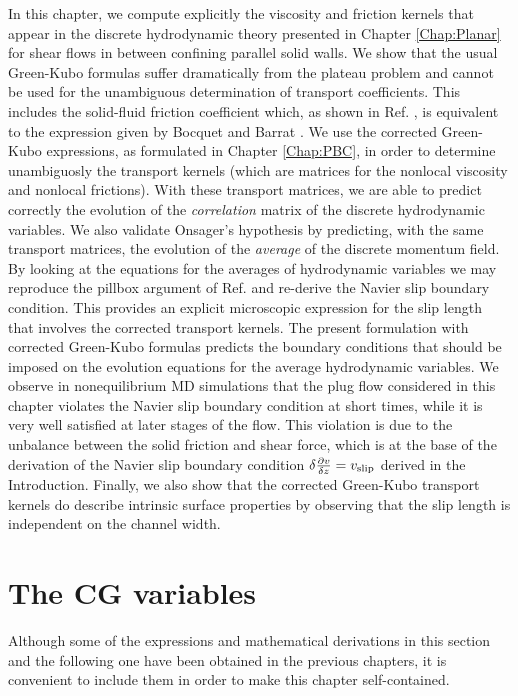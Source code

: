 \documentclass[b5paper,openright,10pt]{book}
\begin{document}
In this chapter, we compute explicitly the viscosity and friction kernels that appear in the discrete hydrodynamic theory presented in Chapter \ref{Chap:Planar} for shear flows in between confining parallel solid walls.  
We show  that  the  usual Green-Kubo  formulas  suffer
dramatically  from the  plateau problem  and  cannot be  used for  the
unambiguous  determination of  transport coefficients.   This includes
the solid-fluid friction coefficient which,  as shown in Ref. \cite{CamargoBC2018},
is  equivalent  to   the  expression  given  by   Bocquet  and  Barrat
\cite{Bocquet1994}.  We  use the corrected Green-Kubo  expressions, as
formulated in  Chapter \ref{Chap:PBC}, in  order to determine  unambiguosly the
transport kernels (which are matrices for the nonlocal viscosity and
nonlocal frictions).  With  these transport matrices, we  are able to
predict correctly the evolution  of the \textit{correlation} matrix of
the  discrete  hydrodynamic  variables.  We  also  validate  Onsager's
hypothesis  by  predicting,  with  the same  transport  matrices,  the
evolution of the \textit{average} of  the discrete momentum field.  By
looking at the equations for the averages of hydrodynamic variables we
may reproduce the pillbox argument of Ref.  \cite{CamargoBC2018} and re-derive the
Navier slip boundary condition.  This provides an explicit microscopic
expression for the  slip length that involves  the corrected transport
kernels.  The  present formulation with corrected  Green-Kubo formulas
predicts  the  boundary  conditions  that should  be  imposed  on  the
evolution equations for the average hydrodynamic variables. We observe
in nonequilibrium  MD simulations  that the  plug flow  considered in
this chapter violates the Navier slip boundary condition at short times,
while it is very  well  satisfied at  later stages  of  the flow.   This
violation is due to the unbalance between the solid friction and shear
force,  which is  at the  base of  the derivation  of the  Navier slip
boundary  condition $\delta\frac{\partial v}{\delta z}=v_{{\rm slip}}$ derived in the Introduction.   Finally, we  also show  that the
corrected Green-Kubo  transport kernels do describe  intrinsic surface
properties by  observing that  the slip length  is independent  on the
channel width.

\section{The CG variables}
\label{Sec:CGSlip}
Although some of the expressions and mathematical derivations in this section and the following one  have been obtained in the previous chapters, it is convenient to include them in order to make this chapter self-contained.
\end{document}
